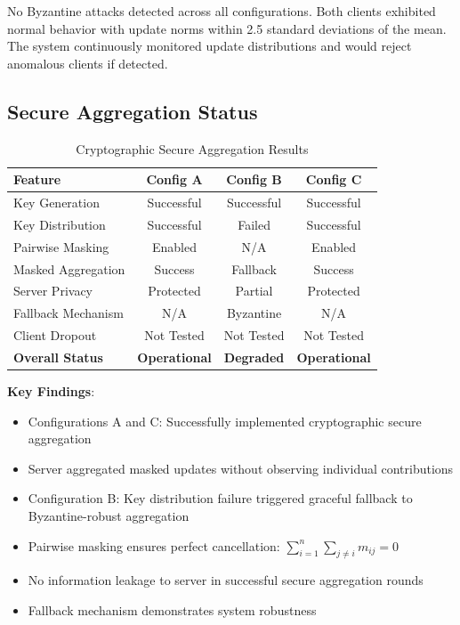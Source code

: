 \documentclass[acmsmall,screen]{acmart}
\begin{document}
No Byzantine attacks detected across all configurations. Both clients exhibited normal behavior with update norms within 2.5 standard deviations of the mean. The system continuously monitored update distributions and would reject anomalous clients if detected.

\subsection{Secure Aggregation Status}

\begin{table}[h]
\centering
\caption{Cryptographic Secure Aggregation Results}
\label{tab:secure_agg}
\begin{tabular}{@{}lccc@{}}
\toprule
\textbf{Feature} & \textbf{Config A} & \textbf{Config B} & \textbf{Config C} \\
\midrule
Key Generation & Successful & Successful & Successful \\
Key Distribution & Successful & Failed & Successful \\
Pairwise Masking & Enabled & N/A & Enabled \\
Masked Aggregation & Success & Fallback & Success \\
Server Privacy & Protected & Partial & Protected \\
Fallback Mechanism & N/A & Byzantine & N/A \\
Client Dropout & Not Tested & Not Tested & Not Tested \\
\midrule
\textbf{Overall Status} & \textbf{Operational} & \textbf{Degraded} & \textbf{Operational} \\
\bottomrule
\end{tabular}
\end{table}

\textbf{Key Findings}:
\begin{itemize}
    \item Configurations A and C: Successfully implemented cryptographic secure aggregation
    \item Server aggregated masked updates without observing individual contributions
    \item Configuration B: Key distribution failure triggered graceful fallback to Byzantine-robust aggregation
    \item Pairwise masking ensures perfect cancellation: $\sum_{i=1}^n \sum_{j \neq i} m_{ij} = 0$
    \item No information leakage to server in successful secure aggregation rounds
    \item Fallback mechanism demonstrates system robustness
\end{itemize}
\end{document}
